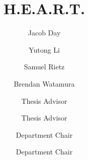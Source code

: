 \documentclass{scu-thesis}
\author{Jacob Day}
\author{Yutong Li}
\author{Samuel Rietz}
\author{Brendan Watamura}
\title{H.E.A.R.T.}
\begin{document}
\frontmatter
\signature{Thesis Advisor}
\signature{Thesis Advisor}
\signature{Department Chair}
\signature{Department Chair}

\maketitle


\tableofcontents
\listoffigures
\listoftables

\mainmatter












\backmatter
\end{document}
